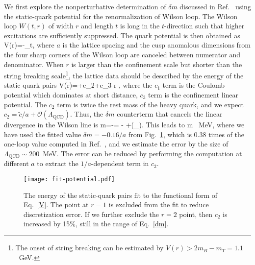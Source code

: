 We first explore the nonperturbative determination of $\delta m$ discussed in Ref.~\cite{Musch:2010ka} using the static-quark potential for the renormalization of Wilson loop. The Wilson loop $W(t,r)$ of width $r$ and length $t$ is long in the $t$-direction such that higher excitations are sufficiently suppressed. The quark potential is then obtained as
\beq
V(r)=-\lim_{t\to\infty}\ln{},
\eeq
where $a$ is the lattice spacing and the cusp anomalous dimensions from the four sharp corners of the Wilson loop are canceled between numerator and denominator. When $r$ is larger than the confinement scale but shorter than the string breaking scale\footnote{The onset of string breaking can be estimated by $V(r) > 2 m_B-m_{\Upsilon}=1.1$~GeV.}, the lattice data should be described by
the energy of the static quark pairs
\beq\label{V}
V(r)=+c_2+c_3 r ,
\eeq
where the $c_1$ term is the Coulomb potential which dominates at short distance,  $c_3$ term is the confinement linear potential. The $c_2$ term is twice the rest mass of the heavy quark, and we expect $c_2=\tilde{c}/a+\mathcal{O}(\Lambda_{\text{QCD}})$. Thus, the $\delta m$ counterterm that cancels the linear divergence in the Wilson line is 
\beq
\delta m=-= - +(\Lambda_{}).
\eeq
This leads to
\beq\label{dm}
\delta m  \mbox{ MeV},
\eeq
where we have used the fitted value $\delta m=-0.16/a$ from Fig.~\ref{fig:V}, which is $0.38$ times of the one-loop value computed in Ref.~\cite{Chen:2016fxx}, 
and we estimate the error by the size of $\Lambda_{\text{QCD}} \sim 200$~MeV. The error can be reduced by performing the computation at different $a$ to extract the $1/a$-dependent term in $c_2$.


\begin{figure}[tbp]
\texttt{[image: fit-potential.pdf]}
\caption{The energy of the static-quark pairs fit to the functional form of Eq.~\ref{V}.
The point at $r=1$ is excluded from the fit to reduce discretization error. If we further exclude the $r=2$ point, then $c_2$ is increased by 15\%, still in the range of Eq.~\ref{dm}.}
\label{fig:V}
\end{figure}


